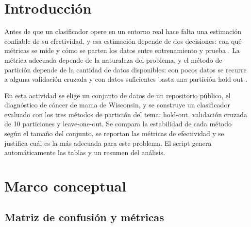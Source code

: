 \documentclass[11pt,letterpaper]{article}
\begin{document}
\portada
\indicegeneral


\section{Introducción}

Antes de que un clasificador opere en un entorno real hace falta una estimación confiable de su efectividad, y esa estimación depende de dos decisiones: con qué métricas se mide y cómo se parten los datos entre entrenamiento y prueba \parencite{tecnm2026_tema33}. La métrica adecuada depende de la naturaleza del problema, y el método de partición depende de la cantidad de datos disponibles: con pocos datos se recurre a alguna validación cruzada y con datos suficientes basta una partición hold-out \parencite{tecnm2026_tema33}.

En esta actividad se elige un conjunto de datos de un repositorio público, el diagnóstico de cáncer de mama de Wisconsin, y se construye un clasificador evaluado con los tres métodos de partición del tema: hold-out, validación cruzada de 10 particiones y leave-one-out. Se compara la estabilidad de cada método según el tamaño del conjunto, se reportan las métricas de efectividad y se justifica cuál es la más adecuada para este problema. El script genera automáticamente las tablas y un resumen del análisis.

\section{Marco conceptual}

\subsection{Matriz de confusión y métricas}
\end{document}
